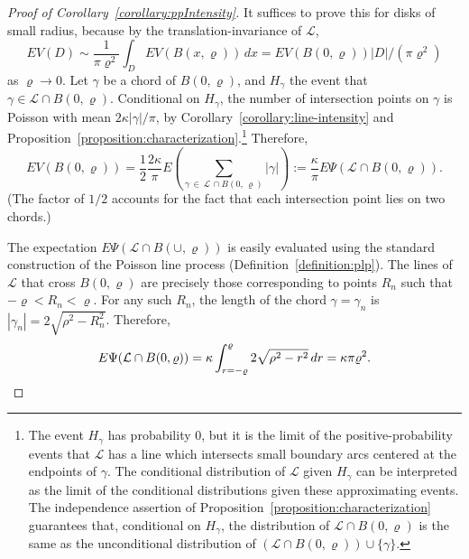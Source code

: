\documentclass[AHL, Unicode, longabstracts, published]{cedram}
\begin{document}
\begin{proof}[Proof of Corollary~\ref{corollary:ppIntensity}]
It suffices to prove this for disks of small radius, because by the translation-invariance of $\mathcal{L}$,
\[
EV (D)\sim \frac{1}{\pi
\varrho^{2}}\int_{D}EV (B (x,\varrho)) \,dx = EV (B (0,\varrho)) |D|/ (\pi \varrho^{2})
\]
as $\varrho \rightarrow 0$. Let $\gamma$ be a chord of $B (0,\varrho)$, and $H_{\gamma}$ the event that $\gamma \in
\mathcal{L}\cap B (0,\varrho)$. Conditional on $H_{\gamma}$, the number of intersection points on $\gamma$ is Poisson with mean $2\kappa |\gamma |/\pi $, by Corollary~\ref{corollary:line-intensity} and Proposition~\ref{proposition:characterization}.\footnote{The event $H_{\gamma}$ has probability $0$, but it is the limit of the positive-probability events that $\mathcal{L}$ has a line which intersects small boundary arcs centered at the endpoints of $\gamma$. The conditional distribution of $\mathcal{L}$ given $H_{\gamma}$ can be interpreted as the limit of the conditional distributions given these approximating events. The independence assertion of Proposition~\ref{proposition:characterization} guarantees that, conditional on $H_{\gamma}$, the distribution of $\mathcal{L}\cap B (0,\varrho)$ is the same as the unconditional distribution of $(\mathcal{L}\cap B (0,\varrho))\cup \{\gamma \}$.} Therefore,
\[
EV (B (0,\varrho))= \frac{1}{2} \frac{2\kappa}{\pi} E\left(\sum_{\gamma\,\in\,\mathcal{L}\,\cap B(0,\,\varrho)} |\gamma |\right):=\frac{\kappa}{\pi }E\Psi (\mathcal{L}\cap B (0,\varrho)).
\]
(The factor of $1/2$ accounts for the fact that each intersection point lies on two chords.)

The expectation $E\Psi (\mathcal{L}\cap B (\cup,\varrho))$ is easily evaluated using the standard construction of the Poisson line process (Definition~\ref{definition:plp}). The lines of $\mathcal{L}$ that cross $B (0,\varrho)$ are precisely those corresponding to points $R_{n}$ such that $-\varrho <R_{n}<\varrho$. For any such $R_{n}$, the length of the chord $\gamma=\gamma_{n}$ is $|\gamma_{n}|=2\sqrt{\rho^{2}-R_{n}^{2}}$. Therefore,
\[
E\Psi (\mathcal{L}\cap B (0,\varrho))=\kappa
\int_{r=-\varrho }^{\varrho} 2\sqrt{\rho^{2}-r^{2}} \,dr=\kappa \pi \varrho^{2}.\qedhere
\]
\end{proof}
\end{document}
